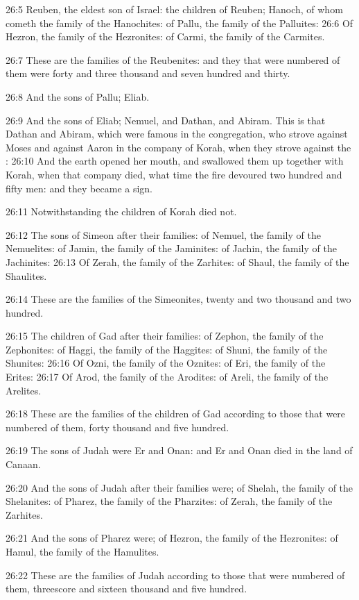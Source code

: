 26:5 Reuben, the eldest son of Israel: the children of Reuben; Hanoch,
of whom cometh the family of the Hanochites: of Pallu, the family of
the Palluites: 26:6 Of Hezron, the family of the Hezronites: of Carmi,
the family of the Carmites.

26:7 These are the families of the Reubenites: and they that were
numbered of them were forty and three thousand and seven hundred and
thirty.

26:8 And the sons of Pallu; Eliab.

26:9 And the sons of Eliab; Nemuel, and Dathan, and Abiram. This is
that Dathan and Abiram, which were famous in the congregation, who
strove against Moses and against Aaron in the company of Korah, when
they strove against the \LORD: 26:10 And the earth opened her mouth,
and swallowed them up together with Korah, when that company died,
what time the fire devoured two hundred and fifty men: and they became
a sign.

26:11 Notwithstanding the children of Korah died not.

26:12 The sons of Simeon after their families: of Nemuel, the family
of the Nemuelites: of Jamin, the family of the Jaminites: of Jachin,
the family of the Jachinites: 26:13 Of Zerah, the family of the
Zarhites: of Shaul, the family of the Shaulites.

26:14 These are the families of the Simeonites, twenty and two
thousand and two hundred.

26:15 The children of Gad after their families: of Zephon, the family
of the Zephonites: of Haggi, the family of the Haggites: of Shuni, the
family of the Shunites: 26:16 Of Ozni, the family of the Oznites: of
Eri, the family of the Erites: 26:17 Of Arod, the family of the
Arodites: of Areli, the family of the Arelites.

26:18 These are the families of the children of Gad according to those
that were numbered of them, forty thousand and five hundred.

26:19 The sons of Judah were Er and Onan: and Er and Onan died in the
land of Canaan.

26:20 And the sons of Judah after their families were; of Shelah, the
family of the Shelanites: of Pharez, the family of the Pharzites: of
Zerah, the family of the Zarhites.

26:21 And the sons of Pharez were; of Hezron, the family of the
Hezronites: of Hamul, the family of the Hamulites.

26:22 These are the families of Judah according to those that were
numbered of them, threescore and sixteen thousand and five hundred.


